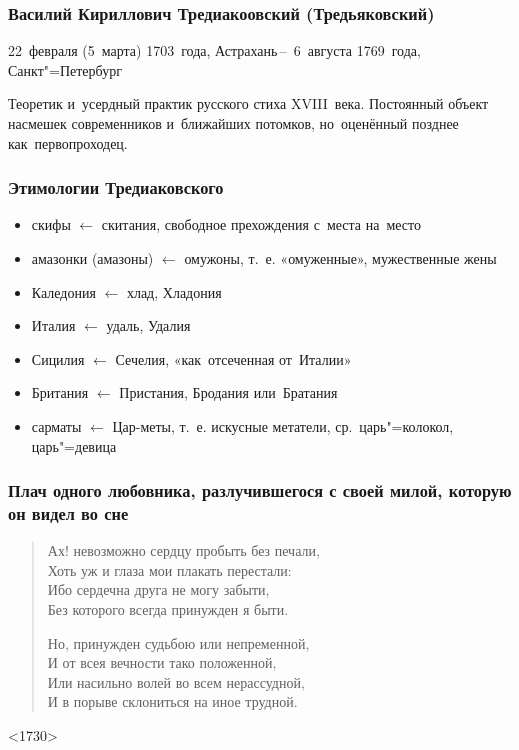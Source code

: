 \documentclass{beamer}
\begin{document}

\begin{frame}
\frametitle{Василий Кириллович Тредиакоовский (Тредьяковский) }
\begin{flushleft}
22~февраля (5~марта) 1703~года, Астрахань\,--\,
6~августа 1769~года, Санкт"=Петербург
\end{flushleft}

\begin{flushleft}
Теоретик и~усердный практик русского стиха XVIII~века. Постоянный объект насмешек современников и~ближайших потомков, но~оценённый позднее как~первопроходец.
\end{flushleft}

\end{frame}

%

\begin{frame}
\frametitle{Этимологии Тредиаковского}

\begin{itemize}
\item скифы $ \leftarrow $ скитания, свободное прехождения с~места на~место
\item амазонки (амазоны) $ \leftarrow $ омужоны, т.~е. «омуженные», мужественные жены
\item Каледония $ \leftarrow $ хлад, Хладония
\item Италия $ \leftarrow $ удаль, Удалия
\item Сицилия $ \leftarrow $ Сечелия, «как~отсеченная от~Италии»
\item Британия $ \leftarrow $ Пристания, Бродания или~Братания
\item сарматы $ \leftarrow $ Цар-меты, т.~е. искусные метатели, ср.~царь"=колокол, царь"=девица
\end{itemize}

\end{frame}

%

\begin{frame}
\frametitle{Плач одного любовника, разлучившегося с своей милой, которую он видел во сне}

\begin{verse}
Ах! невозможно сердцу пробыть без печали,\\
Хоть уж и глаза мои плакать перестали:\\
Ибо сердечна друга не могу забыти,\\
Без которого всегда принужден я быти.

Но, принужден судьбою или непременной,\\
И от всея вечности тако положенной,\\
Или насильно волей во всем нерассудной,\\
И в порыве склониться на иное трудной.

\end{verse}
<1730>
\end{frame}
\end{document}
